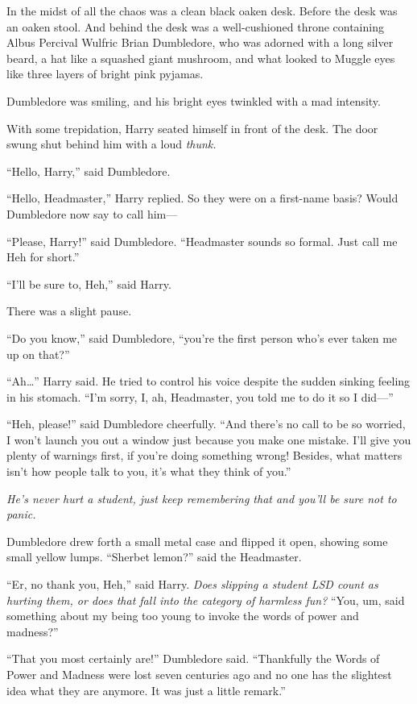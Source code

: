 In the midst of all the chaos was a clean black oaken desk. Before the
desk was an oaken stool. And behind the desk was a well-cushioned throne
containing Albus Percival Wulfric Brian Dumbledore, who was adorned with
a long silver beard, a hat like a squashed giant mushroom, and what
looked to Muggle eyes like three layers of bright pink pyjamas.

Dumbledore was smiling, and his bright eyes twinkled with a mad
intensity.

With some trepidation, Harry seated himself in front of the desk. The
door swung shut behind him with a loud \emph{thunk.}

``Hello, Harry,'' said Dumbledore.

``Hello, Headmaster,'' Harry replied. So they were on a first-name
basis? Would Dumbledore now say to call him---

``Please, Harry!'' said Dumbledore. ``Headmaster sounds so formal. Just
call me Heh for short.''

``I'll be sure to, Heh,'' said Harry.

There was a slight pause.

``Do you know,'' said Dumbledore, ``you're the first person who's ever
taken me up on that?''

``Ah\ldots{}'' Harry said. He tried to control his voice despite the
sudden sinking feeling in his stomach. ``I'm sorry, I, ah, Headmaster,
you told me to do it so I did---''

``Heh, please!'' said Dumbledore cheerfully. ``And there's no call to be
so worried, I won't launch you out a window just because you make one
mistake. I'll give you plenty of warnings first, if you're doing
something wrong! Besides, what matters isn't how people talk to you,
it's what they think of you.''

\emph{He's never hurt a student, just keep remembering that and you'll
be sure not to panic.}

Dumbledore drew forth a small metal case and flipped it open, showing
some small yellow lumps. ``Sherbet lemon?'' said the Headmaster.

``Er, no thank you, Heh,'' said Harry. \emph{Does slipping a student LSD
count as hurting them, or does that fall into the category of harmless
fun?} ``You, um, said something about my being too young to invoke the
words of power and madness?''

``That you most certainly are!'' Dumbledore said. ``Thankfully the Words
of Power and Madness were lost seven centuries ago and no one has the
slightest idea what they are anymore. It was just a little remark.''

